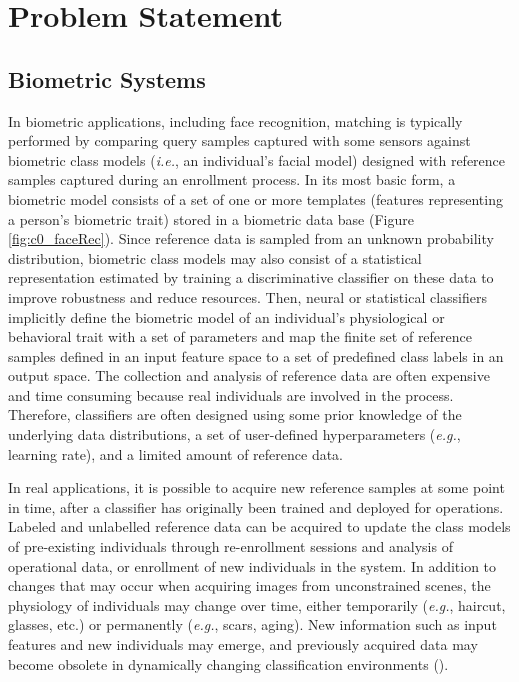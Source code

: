 \section{Problem Statement}

\subsection{Biometric Systems}

In biometric applications, including face recognition, matching is typically performed by comparing query samples captured with some sensors against biometric class models (\emph{i.e.}, an individual's facial model) designed with reference samples captured during an enrollment process.
In its most basic form, a biometric model consists of a set of one or more templates (features representing a person's biometric trait) stored in a biometric data base (Figure \ref{fig:c0_faceRec}).
Since reference data is sampled from an unknown probability distribution, biometric class models may also consist of a statistical representation estimated by training a discriminative classifier on these data to improve robustness and reduce resources.
Then, neural or statistical classifiers implicitly define the biometric model of an individual's physiological or behavioral trait with a set of parameters and map the finite set of reference samples defined in an input feature space to a set of predefined class labels in an output space.
The collection and analysis of reference data are often expensive and time consuming because real individuals are involved in the process.
Therefore, classifiers are often designed using some prior knowledge of the underlying data distributions, a set of user-defined hyperparameters (\emph{e.g.}, learning rate), and a limited amount of reference data.

In real applications, it is possible to acquire new reference samples at some point in time, after a classifier has originally been trained and deployed for operations.
Labeled and unlabelled reference data can be acquired to update the class models of pre-existing individuals through re-enrollment sessions and analysis of operational data, or enrollment of new individuals in the system.
In addition to changes that may occur when acquiring images from unconstrained scenes, the physiology of individuals may change over time, either temporarily (\emph{e.g.}, haircut, glasses, etc.) or permanently (\emph{e.g.}, scars, aging).
New information such as input features and new individuals may emerge, and previously acquired data may become obsolete in dynamically changing classification environments (\cite{granger01, tsymbal08}).

